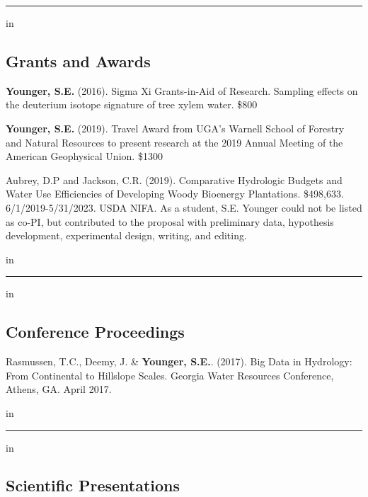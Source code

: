 \documentclass[10pt,letterpaper]{article}
\begin{document}
	\hrule
	\vspace{-0.4em}
	 in
	\subsection*{Grants and Awards}
	
	\begin{hangparas}{.25in}{1}
		
		\textbf{Younger, S.E.} (2016). Sigma Xi Grants-in-Aid of Research. Sampling effects on the deuterium isotope signature of tree xylem water. \$800
		
		\textbf{Younger, S.E.} (2019). Travel Award from UGA's Warnell School of Forestry and Natural Resources to present research at the 2019 Annual Meeting of the American Geophysical Union. \$1300
		
		Aubrey, D.P and Jackson, C.R. (2019). Comparative Hydrologic Budgets and Water Use Efficiencies of Developing Woody Bioenergy Plantations. \$498,633. 6/1/2019-5/31/2023. USDA NIFA. As a student, S.E. Younger could not be listed as co-PI, but contributed to the proposal with preliminary data, hypothesis development, experimental design, writing, and editing.
		
		\vspace{-0.4em}
		 in
		
	\end{hangparas}
	
	\hrule
	\vspace{-0.4em}
	 in
	\subsection*{Conference Proceedings}
	
	\begin{hangparas}{.25in}{1}
		
		Rasmussen, T.C., Deemy, J. \& \textbf{Younger, S.E.}. (2017). Big Data in Hydrology: From Continental to Hillslope Scales. Georgia Water Resources Conference, Athens, GA. April 2017.
		
	\end{hangparas}
	
	 in
	
	
	\hrule
	\vspace{-0.4em}
	 in
	
	\subsection*{Scientific Presentations}
	
\end{document}

